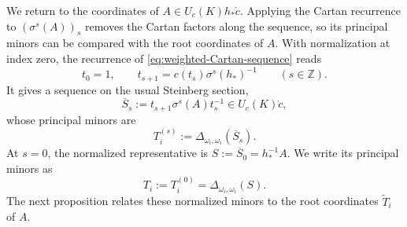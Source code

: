\documentclass[11pt,leqno]{amsart}
\numberwithin{equation}{section}
\theoremstyle{plain}
\theoremstyle{definition}
\theoremstyle{plain}
\theoremstyle{definition}
\theoremstyle{remark}
\begin{document}
We return to the coordinates of $A\in U_c(K)h_*\dot c$. Applying the Cartan recurrence to $(\sigma^s(A))_s$ removes the Cartan factors along the sequence, so its principal minors can be compared with the root coordinates of $A$. With normalization at index zero, the recurrence of \eqref{eq:weighted-Cartan-sequence} reads
\begin{equation}\label{eq:Cartan-factor-recursion}
 t_0=1,\qquad t_{s+1}=c(t_s)\sigma^s(h_*)^{-1}
 \qquad(s\in\mathbb Z).
\end{equation}
It gives a sequence on the usual Steinberg section,
\begin{equation}\label{eq:weighted-standard-Steinberg}
 \overline S_s:=t_{s+1}\sigma^s(A)t_s^{-1}\in U_c(K)\dot c,
\end{equation}
whose principal minors are
\begin{equation}\label{eq:theta-as-BC-component}
 T_i^{(s)}:=\Delta_{\omega_i,\omega_i}(\overline S_s).
\end{equation}
At $s=0$, the normalized representative is $S:=\overline S_0=h_*^{-1}A$.  We write its principal minors as
\[
 T_i:=T_i^{(0)}=\Delta_{\omega_i,\omega_i}(S).
\]
The next proposition relates these normalized minors to the root coordinates $\widetilde T_i$ of $A$.
\end{document}
